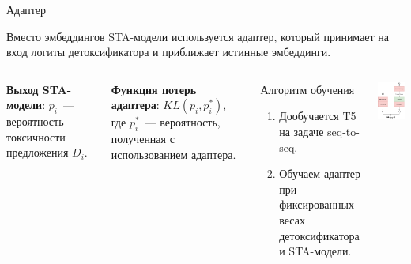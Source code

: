\documentclass[12pt, fleqn, xcolor=x11names, xcolor=table, aspectratio=169]{beamer}
\begin{document}






\begin{frame}{Адаптер}

Вместо эмбеддингов STA-модели используется адаптер, который принимает на вход логиты детоксификатора и приближает истинные эмбеддинги. 

\vfill

\begin{columns}
\textbf{Выход STA-модели}: $ p_i$~--- вероятность токсичности предложения $D_{i}$.

\textbf{Функция потерь адаптера}: $KL(p_i, p_i^{*})$, где $p_i^{*}$~--- вероятность, полученная с использованием адаптера.

\begin{alertblock}{Алгоритм обучения}
\begin{enumerate}
    \item Дообучается T5 на задаче seq-to-seq.
    \item Обучаем адаптер при фиксированных весах детоксификатора и STA-модели.
\end{enumerate}
\end{alertblock}

\includegraphics[width=3.5cm]{images/adapter_train.drawio.pdf}
\end{columns} 
\end{frame}
\end{document}
